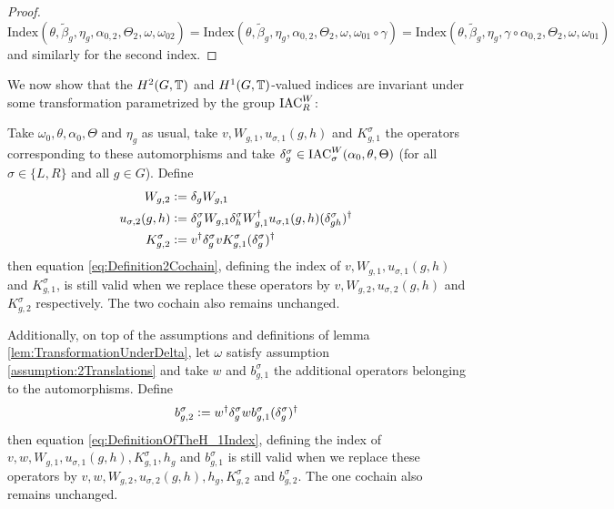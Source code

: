 \documentclass[11pt,a4paper,twoside]{article}
\numberwithin{equation}{section}
\begin{document}
\begin{proof}
		\begin{equation}
			\textrm{Index}(\theta,\tilde{\beta}_g,\eta_g,\alpha_{0,2},\Theta_2,\omega,\omega_{02})=\textrm{Index}(\theta,\tilde{\beta}_g,\eta_g,\alpha_{0,2},\Theta_2,\omega,\omega_{01}\circ\gamma)=\textrm{Index}(\theta,\tilde{\beta}_g,\eta_g,\gamma\circ\alpha_{0,2},\Theta_2,\omega,\omega_{01})
		\end{equation}
		and similarly for the second index.
	\end{proof}
	We now show that the $H^2(G,\mathbb T)$ and $H^1(G,\mathbb T)$-valued indices are invariant under some transformation parametrized by the group $\textrm{IAC}_R^W$:
	\begin{lemma}\label{lem:TransformationUnderDelta}
		Take $\omega_0,\theta,\alpha_0,\Theta$ and $\eta_g$ as usual, take $v,W_{g,1},u_{\sigma,1}(g,h)$ and $K_{g,1}^\sigma$ the operators corresponding to these automorphisms and take $\delta^\sigma_g\in\textrm{IAC}_\sigma^W(\alpha_0,\theta,\Theta)$ (for all $\sigma\in\{L,R\}$ and all $g\in G$). Define
		\begin{align}
			W_{g,2}&\vcentcolon=\delta_g W_{g,1}\\
			u_{\sigma,2}(g,h)&\vcentcolon= \delta_g^\sigma W_{g,1}\delta_h^\sigma W_{g,1}^\dagger u_{\sigma,1}(g,h)(\delta_{gh}^\sigma)^\dagger\\
			K^\sigma_{g,2}&\vcentcolon= v^\dagger \delta_g^\sigma v K_{g,1}^\sigma (\delta_g^\sigma)^\dagger
		\end{align}
		then equation \eqref{eq:Definition2Cochain}, defining the index of $v,W_{g,1},u_{\sigma,1}(g,h)$ and $K_{g,1}^\sigma$, is still valid when we replace these operators by $v,W_{g,2},u_{\sigma,2}(g,h)$ and $K_{g,2}^\sigma$ respectively. The two cochain also remains unchanged.
	\end{lemma}
	\begin{lemma}\label{lem:TransformationUnderDeltaTwoTranslations}
		Additionally, on top of the assumptions and definitions of lemma \ref{lem:TransformationUnderDelta}, let $\omega$ satisfy assumption \ref{assumption:2Translations} and take $w$ and $b_{g,1}^\sigma$ the additional operators belonging to the automorphisms. Define
		\begin{equation}
			b_{g,2}^\sigma\vcentcolon= w^\dagger\delta^\sigma_g w b_{g,1}^\sigma (\delta^\sigma_g)^\dagger
		\end{equation}
		then equation \ref{eq:DefinitionOfTheH_1Index}, defining the index of $v,w,W_{g,1},u_{\sigma,1}(g,h),K_{g,1}^\sigma,h_g$ and $b_{g,1}^\sigma$ is still valid when we replace these operators by $v,w,W_{g,2},u_{\sigma,2}(g,h),h_g,K_{g,2}^\sigma$ and $b_{g,2}^\sigma$. The one cochain also remains unchanged.
	\end{lemma}
\end{document}
